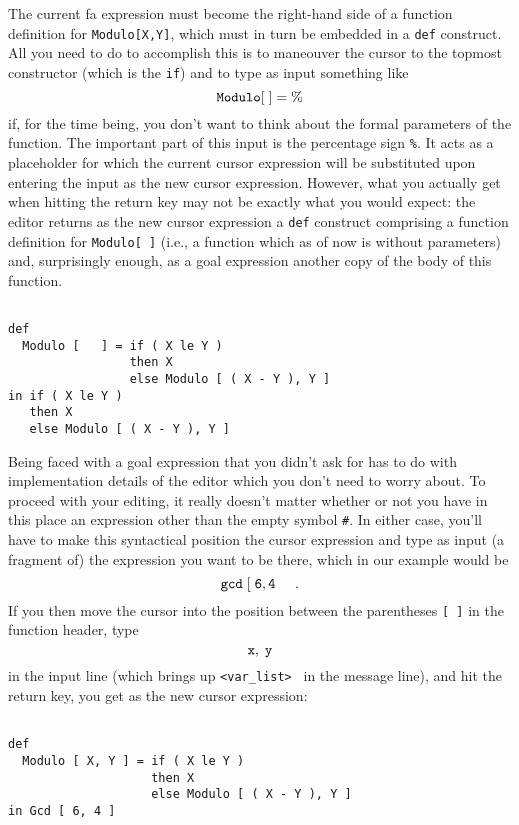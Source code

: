 The current {\sc fa} expression must become the right-hand
side of a function definition for {\tt Modulo[X,Y]}, which must
in turn be embedded in a {\tt def} construct.
All you need to do to accomplish this is to maneouver the cursor to
the topmost constructor (which is the {\tt if}) and
 to type as input something like
$$
{\tt Modulo [\;] = \%}
$$
 if, for the time being, you don't want to think about
the formal parameters of the function. The important part of this input is the
percentage sign {\tt \%}. It acts as a {\mys placeholder} for which the current
 cursor expression will be substituted  upon entering 
 the input
 as the new cursor expression. 
However, what you actually get when hitting the return key may not be exactly
what you would expect: the editor returns as the new cursor expression a
{\tt def} construct comprising a function definition for {\tt Modulo[ ]}
(i.e., a function which as of now is without parameters) and, surprisingly enough, as a goal
expression another copy of the body of this function. 
\begin{verbatim}

def 
  Modulo [   ] = if ( X le Y )
                 then X
                 else Modulo [ ( X - Y ), Y ]
in if ( X le Y )
   then X
   else Modulo [ ( X - Y ), Y ]

\end{verbatim}
Being faced with a goal expression that you didn't ask for has to
 do with implementation details of the editor which you don't need
 to worry about. To proceed with your editing, it really doesn't matter
whether or not you have in this place an expression other than the empty
symbol {\tt \#}. In either case, you'll have to make this syntactical
position the cursor expression and type as input (a fragment of) the expression
you want to be there, which in our example would be
$$
 {\tt gcd\; [\; 6, 4  }\;\;\;\;\;                         . 
$$
If you then move the cursor into the position between the parentheses
{\tt [ ]} in the function header, type
$$
 {\tt x,\; y}
$$
 in the input line
(which brings up {\tt <var\_list> } in the message line), and hit the return
key, you get as the new cursor expression:
\begin{verbatim}

def 
  Modulo [ X, Y ] = if ( X le Y )
                    then X
                    else Modulo [ ( X - Y ), Y ]
in Gcd [ 6, 4 ]

\end{verbatim}

